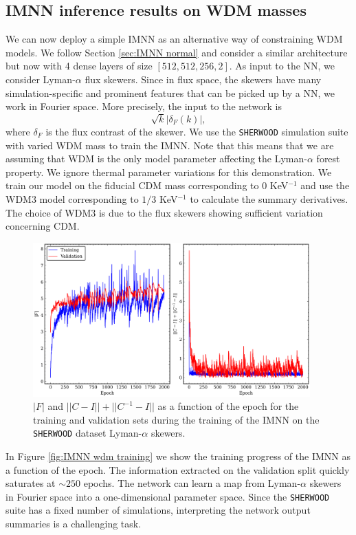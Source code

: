 \subsection{IMNN inference results on WDM masses}\label{sec:IMNN}
We can now deploy a simple IMNN as an alternative way of constraining WDM models. We follow Section \ref{sec:IMNN normal} and consider a similar architecture but now with 4 dense layers of size $[512, 512, 256, 2]$. As input to the NN, we consider Lyman-$\alpha$ flux skewers. Since in flux space, the skewers have many simulation-specific and prominent features that can be picked up by a NN, we work in Fourier space. More precisely, the input to the network is 
\begin{equation}
    \sqrt{k} |\delta_F (k)|,
\end{equation}
where $\delta_F$ is the flux contrast of the skewer.
We use the \texttt{SHERWOOD} simulation suite with varied WDM mass to train the IMNN. Note that this means that we are assuming that WDM is the only model parameter affecting the Lyman-$\alpha$ forest property. We ignore thermal parameter variations for this demonstration. We train our model on the fiducial CDM mass corresponding to $0$ KeV$^{-1}$ and use the WDM3 model corresponding to $1/3$ KeV$^{-1}$ to calculate the summary derivatives. The choice of WDM3 is due to the flux skewers showing sufficient variation concerning CDM.

\begin{figure}
    \centering
    \includegraphics[width=0.95\textwidth]{img/ML/WDM_training_plot.png}
    \caption{$|F|$ and $||C-I||+||C^{-1}-I||$ as a function of the epoch for the training and validation sets during the training of the IMNN on the \texttt{SHERWOOD} dataset Lyman-$\alpha$ skewers.}
    \label{fig:IMNN  wdm training}
\end{figure}
In Figure \ref{fig:IMNN wdm training} we show the training progress of the IMNN as a function of the epoch. The information extracted on the validation split quickly saturates at $\sim 250$ epochs. The network can learn a map from Lyman-$\alpha$ skewers in Fourier space into a one-dimensional parameter space. Since the \texttt{SHERWOOD} suite has a fixed number of simulations, interpreting the network output summaries is a challenging task.


